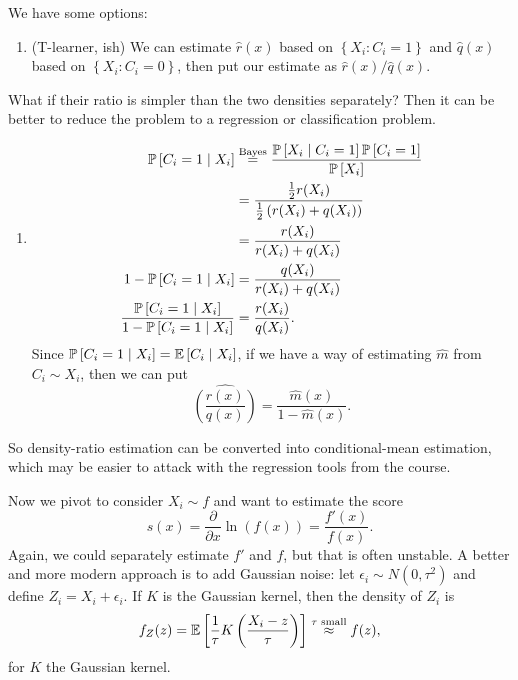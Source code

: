 We have some options:
\begin{enumerate}[label=(\roman*)]
	\item (T-learner, ish) We can estimate $\hat{r}(x)$ based on $\left\{X_i : C_i = 1\right\}$ and $\hat{q}(x)$ based on $\left\{X_i : C_i = 0\right\}$, then put our estimate as $\hat{r}(x) / \hat{q}(x)$.
\end{enumerate}
What if their ratio is simpler than the two densities separately? Then it can be better to reduce the problem to a regression or classification problem.
\begin{enumerate}[label=(\roman*), resume]
		\item \begin{align*}
				\P\left[C_i = 1 \mid X_i \right]
				&\overset{\text{Bayes}}{=} \frac{\P\left[X_i \mid C_i = 1\right] \P\left[C_i = 1\right] }{\P\left[X_i\right] } \\
				&= \frac{\frac{1}{2} r(X_i)}{\frac{1}{2}\left( r(X_i) + q(X_i) \right)} \\
				&= \frac{r(X_i)}{r(X_i) + q(X_i)} \\
				1- \P\left[C_i = 1 \mid X_i\right]
				&= \frac{q(X_i)}{r(X_i) + q(X_i)} \\
				\frac{\P\left[C_i =1 \mid X_i\right] }{1 - \P\left[C_i = 1 \mid X_i\right] }
				&= \frac{r(X_i)}{q(X_i)}
		.\end{align*} 
	Since $\P\left[C_i = 1 \mid X_i\right] = \E\left[C_i \mid X_i\right] $,  if we have a way of estimating $\hat{m}$ from $C_i \sim X_i$, then we can put \[
		\widehat{\left( \frac{r(x)}{q(x)} \right)} = \frac{\hat{m}(x)}{1-\hat{m}(x)}
	.\]
\end{enumerate}
So density-ratio estimation can be converted into conditional-mean estimation, which may be easier to attack with the regression tools from the course.

Now we pivot to consider $X_i \sim f$ and want to estimate the score \[
	s(x) = \frac{\partial}{\partial x} \ln{\left(f(x)\right)} = \frac{f'(x)}{f(x)}
.\] Again, we could separately estimate $f'$ and $f$, but that is often unstable. A better and more modern approach is to add Gaussian noise: let $\epsilon_i \sim N(0,\tau^2)$ and define $Z_i = X_i + \epsilon_i$. If $K$ is the Gaussian kernel, then the density of $Z_i$ is
\[
	f_Z(z) = \E\left[\frac{1}{\tau} K \left( \frac{X_i - z}{\tau} \right)\right] \overset{\tau \text{ small}}{\approx} f(z)
,\]
for $K$ the Gaussian kernel.

